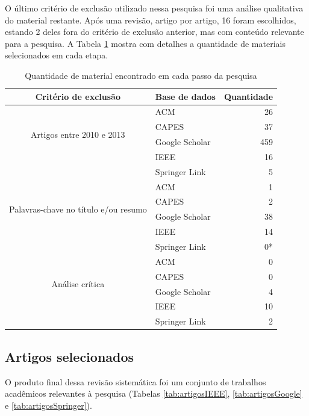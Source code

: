 O último critério de exclusão utilizado nessa pesquisa foi uma análise qualitativa do material restante. Após uma revisão, artigo por artigo, 16 foram escolhidos, estando 2 deles fora do critério de exclusão anterior, mas com conteúdo relevante para a pesquisa. A Tabela  \ref{tab:quantidadeDeMateriais} mostra com detalhes a quantidade de materiais selecionados em cada etapa.

\begin{table}[H]
	\centering
	\begin{tabular}{| c | l | r |} \hline \textbf{Critério de exclusão} & \textbf{Base de dados}  & \textbf{Quantidade} \\ \hline
		\multirow{4}{*}{Artigos entre 2010 e 2013} 
			& ACM & 26 \\ \cline{2-3}
			& CAPES & 37 \\ \cline{2-3}
			& Google Scholar & 459 \\ \cline{2-3}
			& IEEE & 16 \\ \cline{2-3}
			& Springer Link & 5 \\ \cline{2-3}
		\hline \hline
		\multirow{4}{*}{Palavras-chave no título e/ou resumo} 
			& ACM & 1 \\ \cline{2-3}
			& CAPES & 2 \\ \cline{2-3}
			& Google Scholar & 38 \\ \cline{2-3}
			& IEEE & 14 \\ \cline{2-3}
			& Springer Link & 0* \\ \cline{2-3}
		\hline \hline
		\multirow{4}{*}{Análise crítica}
			& ACM & 0 \\ \cline{2-3}
			& CAPES & 0 \\ \cline{2-3}
			& Google Scholar & 4 \\ \cline{2-3}
			& IEEE & 10 \\ \cline{2-3}
			& Springer Link & 2 \\ \cline{2-3}
		\hline
	\end{tabular}
	\captionsetup{justification=centering}
	\caption{Quantidade de material encontrado em cada passo da pesquisa}
	\label{tab:quantidadeDeMateriais}
\end{table}

\subsection{Artigos selecionados}

O produto final dessa revisão sistemática foi um conjunto de trabalhos acadêmicos relevantes à pesquisa (Tabelas \ref{tab:artigosIEEE}, \ref{tab:artigosGoogle} e \ref{tab:artigosSpringer}).

